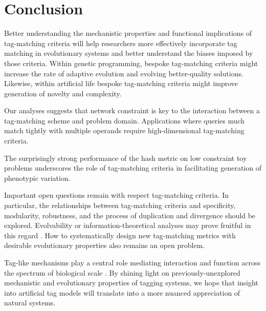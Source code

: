 \section{Conclusion}

Better understanding the mechanistic properties and functional implications of tag-matching criteria will help researchers more effectively incorporate tag matching in evolutionary systems and better understand the biases imposed by those criteria.
Within genetic programming, bespoke tag-matching criteria might increase the rate of adaptive evolution and evolving better-quality solutions.
Likewise, within artificial life bespoke tag-matching criteria might improve generation of novelty and complexity.

Our analyses suggests that network constraint is key to the interaction between a tag-matching scheme and problem domain.
Applications where queries much match tightly with multiple operands require high-dimensional tag-matching criteria.

The surprisingly strong performance of the hash metric on low constraint toy problems   underscores the role of tag-matching criteria in facilitating generation of phenotypic variation.

Important open questions remain with respect tag-matching criteria.
In particular, the relationships between tag-matching criteria and specificity, modularity, robustness, and the process of duplication and divergence should be explored.
Evolvability or information-theoretical analyses may prove fruitful in this regard \citep{tarapore2015evolvability}.
How to systematically design new tag-matching metrics with desirable evolutionary properties also remains an open problem.

Tag-like mechanisms play a central role mediating interaction and function across the spectrum of biological scale \citep{holland2012signals}.
By shining light on previously-unexplored mechanistic and evolutionary properties of tagging systems, we hope that insight into artificial tag models will translate into a more nuanced appreciation of natural systems.
